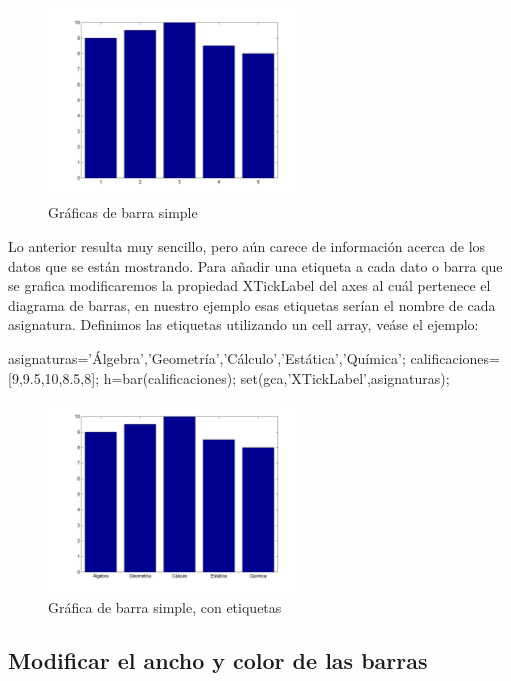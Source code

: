 \begin{figure}[!h]
\centering
\includegraphics[width=0.6\textwidth]{src/img/ch4/barra_simple.png}
\caption{Gráficas de barra simple}
\label{fig:barra_simple}
\end{figure}

Lo anterior resulta muy sencillo, pero aún carece de información acerca de los datos que 
se están mostrando. Para añadir una etiqueta a cada dato o barra que se grafica modificaremos 
la propiedad XTickLabel del axes al cuál pertenece el diagrama de barras, en nuestro ejemplo 
esas etiquetas serían el nombre de cada asignatura. Definimos las etiquetas utilizando un 
cell array, veáse el ejemplo:

\begin{matlab}
asignaturas={'Álgebra','Geometría','Cálculo','Estática','Química'};
calificaciones=[9,9.5,10,8.5,8];
h=bar(calificaciones);
set(gca,'XTickLabel',asignaturas);
\end{matlab}

\begin{figure}[!h]
\centering
\includegraphics[width=0.6\textwidth]{src/img/ch4/barra_simple_02.png}
\caption{Gráfica de barra simple, con etiquetas}
\label{fig:barra_simple_02}
\end{figure}

\subsection{Modificar el ancho y color de las barras}


